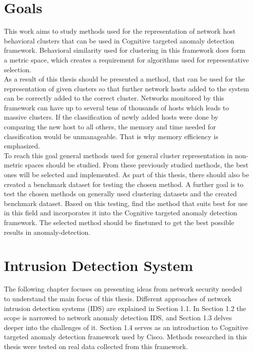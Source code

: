 \documentclass[thesis=B,english]{FITthesis}[2012/10/20]
\begin{document}
\chapter{Goals}

This work aims to study methods used for the representation of network host behavioral clusters that can be used in Cognitive targeted anomaly detection framework.
Behavioral similarity used for clustering in this framework does form a metric space, which creates a requirement for algorithms used for representative selection. \\

As a result of this thesis should be presented a method, that can be used for the representation of given clusters so that further network hosts added to the system can be correctly added to the correct cluster.
Networks monitored by this framework can have up to several tens of thousands of hosts which leads to massive clusters.
If the classification of newly added hosts were done by comparing the new host to all others, the memory and time needed for classification would be unmanageable.
That is why memory efficiency is emphasized. \\

To reach this goal general methods used for general cluster representation in non-metric spaces should be studied.
From these previously studied methods, the best ones will be selected and implemented.
As part of this thesis, there should also be created a benchmark dataset for testing the chosen method.
A further goal is to test the chosen methods on generally used clustering datasets and the created benchmark dataset.
Based on this testing, find the method that suits best for use in this field and incorporates it into the Cognitive targeted anomaly detection framework.
The selected method should be finetuned to get the best possible results in anomaly-detection.



\chapter{Intrusion Detection System}

The following chapter focuses on presenting ideas from network security needed to understand the main focus of this thesis.
Different approaches of network intrusion detection systems (IDS) are explained in Section 1.1.
In Section 1.2 the scope is narrowed to network anomaly detection IDS, and Section 1.3 delves deeper into the challenges of it.
Section 1.4 serves as an introduction to Cognitive targeted anomaly detection framework used by Cisco.
Methods researched in this thesis were tested on real data collected from this framework. \\
\end{document}
